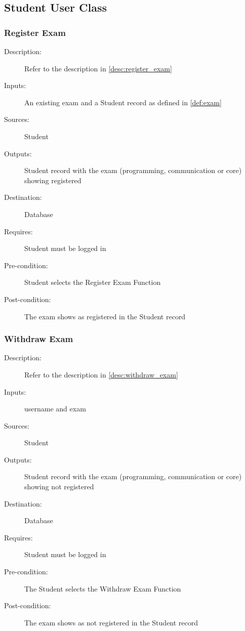 \subsection{Student User Class}

\subsubsection{\large Register Exam} 
\begin{boxed} %
\begin{description}
\item[Description:]
   Refer to the description in \autoref{desc:register_exam}
\item[Inputs:]
   An existing exam and a Student record as defined in \autoref{def:exam}
\item[Sources:]
   Student
\item[Outputs:]
   Student record with the exam (programming, communication or core) showing
   registered
\item[Destination:]
   Database
\item[Requires:]
   Student must be logged in
\item[Pre-condition:]
   Student selects the Register Exam Function
\item[Post-condition:]
   The exam shows as registered in the Student record
\end{description}
\end{boxed} %

\subsubsection{\large Withdraw Exam} 
\begin{boxed} %
\begin{description}
\item[Description:]
   Refer to the description in \autoref{desc:withdraw_exam}
\item[Inputs:]
   username and exam
\item[Sources:]
   Student
\item[Outputs:]
   Student record with the exam (programming, communication or core) showing
   not registered
\item[Destination:]
   Database
\item[Requires:]
   Student must be logged in
\item[Pre-condition:]
   The Student selects the Withdraw Exam Function
\item[Post-condition:]
   The exam shows as not registered in the Student record
\end{description}
\end{boxed} %

